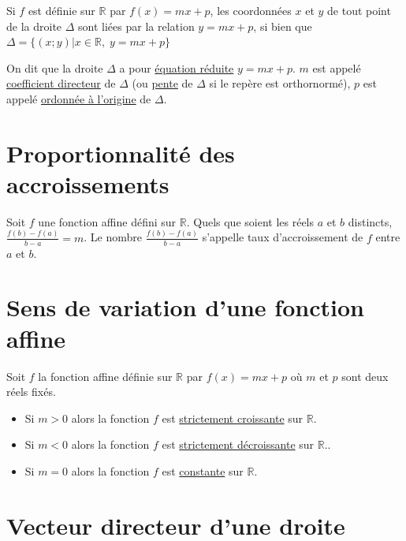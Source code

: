\documentclass[french]{book}
\begin{document}
\begin{rem}
Si $f$ est définie sur $\mathbb{R}$ par $f(x)=mx+p$, les coordonnées $x$ et $y$ de tout point de la droite $\Delta$ sont liées par la relation $y=mx+p$, si bien que $\Delta= \{ (x;y)  \vert x \in \mathbb{R}, \; y=mx+p \} $ 
\end{rem}

On dit que la droite $\Delta$  a pour \underline{équation réduite} $y=mx+p$. $m$ est appelé \underline{ coefficient directeur} de $\Delta$ (ou \underline{pente} de $\Delta$ si le repère est orthornormé), $p$ est appelé \underline{ordonnée à l'origine} de $\Delta$.

\section{Proportionnalité des accroissements}


\begin{prop}
Soit $f$ une fonction affine défini sur $\mathbb{R}$. Quels que soient les réels $a$ et $b$ distincts, $\frac{f(b)-f(a)}{b-a} = m$. Le nombre $\frac{f(b)-f(a)}{b-a}$ s'appelle taux d'accroissement de $f$ entre $a$ et $b$.
\end{prop}


\section{Sens de variation d'une fonction affine}

\begin{prop}
Soit $f$ la fonction affine définie sur $\mathbb{R}$ par $f(x)=mx+p$ où $m$ et $p$ sont deux réels fixés.

\begin{itemize}
\item Si \underline{$m>0$} alors la fonction $f$ est \underline{strictement croissante} sur $\mathbb{R}$.
\item Si \underline{$m<0$} alors la fonction $f$ est \underline{strictement décroissante} sur $\mathbb{R}.$.
\item Si \underline{$m=0$} alors la fonction $f$ est \underline{constante} sur $\mathbb{R}$.
\end{itemize}
\end{prop}



\section{Vecteur directeur d'une droite}
\end{document}
